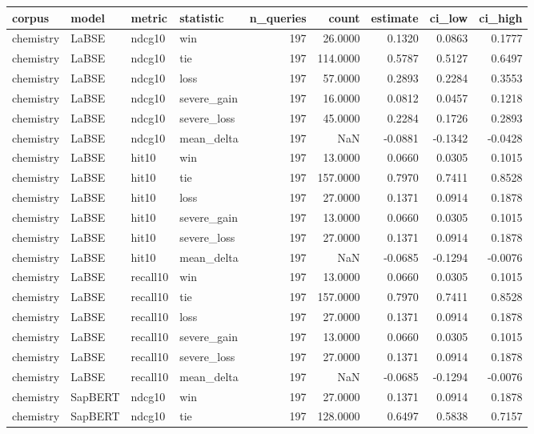\begin{tabular}{llllrrrrr}
\toprule
corpus & model & metric & statistic & n\_queries & count & estimate & ci\_low & ci\_high \\
\midrule
chemistry & LaBSE & ndcg10 & win & 197 & 26.0000 & 0.1320 & 0.0863 & 0.1777 \\
chemistry & LaBSE & ndcg10 & tie & 197 & 114.0000 & 0.5787 & 0.5127 & 0.6497 \\
chemistry & LaBSE & ndcg10 & loss & 197 & 57.0000 & 0.2893 & 0.2284 & 0.3553 \\
chemistry & LaBSE & ndcg10 & severe\_gain & 197 & 16.0000 & 0.0812 & 0.0457 & 0.1218 \\
chemistry & LaBSE & ndcg10 & severe\_loss & 197 & 45.0000 & 0.2284 & 0.1726 & 0.2893 \\
chemistry & LaBSE & ndcg10 & mean\_delta & 197 & NaN & -0.0881 & -0.1342 & -0.0428 \\
chemistry & LaBSE & hit10 & win & 197 & 13.0000 & 0.0660 & 0.0305 & 0.1015 \\
chemistry & LaBSE & hit10 & tie & 197 & 157.0000 & 0.7970 & 0.7411 & 0.8528 \\
chemistry & LaBSE & hit10 & loss & 197 & 27.0000 & 0.1371 & 0.0914 & 0.1878 \\
chemistry & LaBSE & hit10 & severe\_gain & 197 & 13.0000 & 0.0660 & 0.0305 & 0.1015 \\
chemistry & LaBSE & hit10 & severe\_loss & 197 & 27.0000 & 0.1371 & 0.0914 & 0.1878 \\
chemistry & LaBSE & hit10 & mean\_delta & 197 & NaN & -0.0685 & -0.1294 & -0.0076 \\
chemistry & LaBSE & recall10 & win & 197 & 13.0000 & 0.0660 & 0.0305 & 0.1015 \\
chemistry & LaBSE & recall10 & tie & 197 & 157.0000 & 0.7970 & 0.7411 & 0.8528 \\
chemistry & LaBSE & recall10 & loss & 197 & 27.0000 & 0.1371 & 0.0914 & 0.1878 \\
chemistry & LaBSE & recall10 & severe\_gain & 197 & 13.0000 & 0.0660 & 0.0305 & 0.1015 \\
chemistry & LaBSE & recall10 & severe\_loss & 197 & 27.0000 & 0.1371 & 0.0914 & 0.1878 \\
chemistry & LaBSE & recall10 & mean\_delta & 197 & NaN & -0.0685 & -0.1294 & -0.0076 \\
chemistry & SapBERT & ndcg10 & win & 197 & 27.0000 & 0.1371 & 0.0914 & 0.1878 \\
chemistry & SapBERT & ndcg10 & tie & 197 & 128.0000 & 0.6497 & 0.5838 & 0.7157 \\

\end{tabular}
